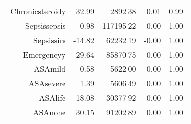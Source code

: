 \begin{tabular}{rrrrr}
$$  Chronic\-steroid\-y & 32.99 & 2892.38 & 0.01 & 0.99 \\ 
  Sepsis\-sepsis & 0.98 & 117195.22 & 0.00 & 1.00 \\ 
  Sepsis\-sirs & -14.82 & 62232.19 & -0.00 & 1.00 \\ 
  Emergency\-y & 29.64 & 85870.75 & 0.00 & 1.00 \\ 
  ASA\-mild & -0.58 & 5622.00 & -0.00 & 1.00 \\ 
  ASA\-severe & 1.39 & 5606.49 & 0.00 & 1.00 \\ 
  ASA\-life & -18.08 & 30377.92 & -0.00 & 1.00 \\ 
  ASA\-none & 30.15 & 91202.89 & 0.00 & 1.00 \\ 
   \hline
\end{tabular}

